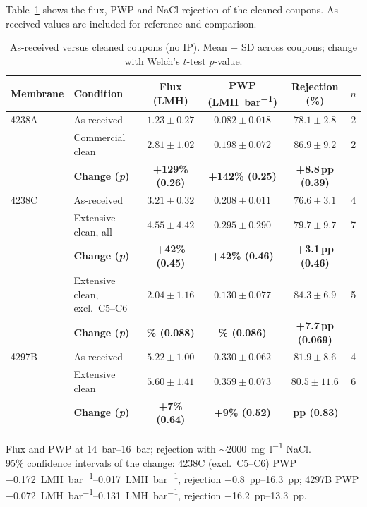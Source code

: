 Table~\ref{tab:clean-compare} shows the flux, PWP and NaCl rejection of the cleaned coupons. As-received values are included for reference and comparison.
\begin{table}[htbp]
  \centering
  \caption{As-received versus cleaned coupons (no IP). Mean $\pm$ SD across coupons; change with Welch's $t$-test $p$-value.}
  \label{tab:clean-compare}
  \small
  \begin{tabular}{llcccc}
    \toprule
    Membrane & Condition & Flux (\unit{LMH}) & PWP (\unit{LMH.bar^{-1}}) & Rejection (\%) & $n$ \\
    \midrule
    4238A & As-received & $1.23 \pm 0.27$ & $0.082 \pm 0.018$ & $78.1 \pm 2.8$ & 2 \\
          & Commercial clean & $2.81 \pm 1.02$ & $0.198 \pm 0.072$ & $86.9 \pm 9.2$ & 2 \\
          & \textbf{Change (\textit{p})} & \textbf{+129\% (0.26)} & \textbf{+142\% (0.25)} & \textbf{+8.8\,pp (0.39)} & \\
    \midrule
    4238C & As-received & $3.21 \pm 0.32$ & $0.208 \pm 0.011$ & $76.6 \pm 3.1$ & 4 \\
          & Extensive clean, all & $4.55 \pm 4.42$ & $0.295 \pm 0.290$ & $79.7 \pm 9.7$ & 7 \\
          & \textbf{Change (\textit{p})} & \textbf{+42\% (0.45)} & \textbf{+42\% (0.46)} & \textbf{+3.1\,pp (0.46)} & \\
          & Extensive clean, excl.\ C5--C6 & $2.04 \pm 1.16$ & $0.130 \pm 0.077$ & $84.3 \pm 6.9$ & 5 \\
          & \textbf{Change (\textit{p})} & \textbf{\textminus 36\% (0.088)} & \textbf{\textminus 37\% (0.086)} & \textbf{+7.7\,pp (0.069)} & \\
    \midrule
    4297B & As-received & $5.22 \pm 1.00$ & $0.330 \pm 0.062$ & $81.9 \pm 8.6$ & 4 \\
          & Extensive clean & $5.60 \pm 1.41$ & $0.359 \pm 0.073$ & $80.5 \pm 11.6$ & 6 \\
          & \textbf{Change (\textit{p})} & \textbf{+7\% (0.64)} & \textbf{+9\% (0.52)} & \textbf{\textminus 1.4\,pp (0.83)} & \\
    \bottomrule
  \end{tabular}
  \par\smallskip
    \footnotesize Flux and PWP at \qtyrange{14}{16}{bar}; rejection with $\sim$\qty{2000}{\milli\gram\per\litre} NaCl. \\95\% confidence intervals of the change: 4238C (excl.\ C5--C6) PWP \qtyrange{-0.172}{0.017}{LMH.bar^{-1}}, rejection \qtyrange{-0.8}{16.3}{pp}; 4297B PWP \qtyrange{-0.072}{0.131}{LMH.bar^{-1}}, rejection \qtyrange{-16.2}{13.3}{pp}.
\end{table}

